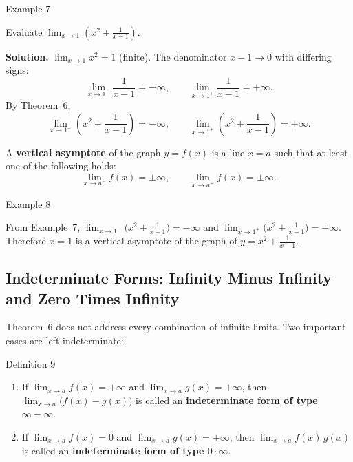\begin{examplebox}{Example 7}

Evaluate \(\displaystyle\lim_{x \to 1} \left( x^{2} + \frac{1}{x - 1} \right)\).

\medskip
\textbf{Solution.}
\(\lim_{x \to 1} x^{2} = 1\) (finite). The denominator \(x - 1 \to 0\) with differing signs:
\[
\lim_{x \to 1^{-}} \frac{1}{x - 1} = -\infty,
\qquad
\lim_{x \to 1^{+}} \frac{1}{x - 1} = +\infty.
\]
By Theorem~6,
\[
\lim_{x \to 1^{-}} \left( x^{2} + \frac{1}{x - 1} \right) = -\infty,
\qquad
\lim_{x \to 1^{+}} \left( x^{2} + \frac{1}{x - 1} \right) = +\infty.
\]
\end{examplebox}

\pagebreak

A \textbf{vertical asymptote} of the graph \(y = f(x)\) is a line \(x = a\) such that at least one of the following holds:
\[
\lim_{x \to a^{-}} f(x) = \pm\infty,
\qquad
\lim_{x \to a^{+}} f(x) = \pm\infty.
\]


\begin{examplebox}{Example 8}

From Example~7, \(\lim_{x \to 1^{-}} \bigl(x^{2} + \frac{1}{x-1}\bigr) = -\infty\) and \(\lim_{x \to 1^{+}} \bigl(x^{2} + \frac{1}{x-1}\bigr) = +\infty\). Therefore \(x = 1\) is a vertical asymptote of the graph of \(y = x^{2} + \frac{1}{x-1}\).
\end{examplebox}

\bigskip


\subsection*{Indeterminate Forms: Infinity Minus Infinity and Zero Times Infinity}
\label{subsec:1.3.2}


Theorem~6 does not address every combination of infinite limits. Two important cases are left indeterminate:

\begin{definitionbox}{Definition 9}
\begin{enumerate}
    \item If \(\displaystyle\lim_{x \to a} f(x) = +\infty\) and \(\displaystyle\lim_{x \to a} g(x) = +\infty\), then \(\displaystyle\lim_{x \to a} \bigl(f(x) - g(x)\bigr)\) is called an \textbf{indeterminate form of type \(\infty - \infty\)}.

    \item If \(\displaystyle\lim_{x \to a} f(x) = 0\) and \(\displaystyle\lim_{x \to a} g(x) = \pm\infty\), then \(\displaystyle\lim_{x \to a} f(x)\,g(x)\) is called an \textbf{indeterminate form of type \(0 \cdot \infty\)}.
\end{enumerate}
\end{definitionbox}


